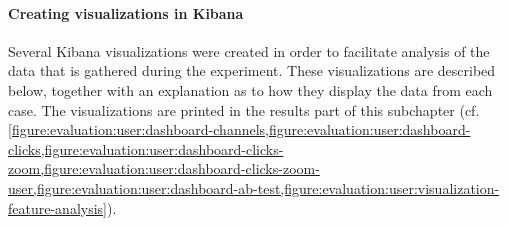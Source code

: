 \paragraph{Creating visualizations in Kibana}

Several Kibana visualizations were created in order to facilitate analysis of the data that is gathered during the experiment.
These visualizations are described below, together with an explanation as to how they display the data from each case.
The visualizations are printed in the results part of this subchapter (cf. \cref{figure:evaluation:user:dashboard-channels,figure:evaluation:user:dashboard-clicks,figure:evaluation:user:dashboard-clicks-zoom,figure:evaluation:user:dashboard-clicks-zoom-user,figure:evaluation:user:dashboard-ab-test,figure:evaluation:user:visualization-feature-analysis}).

